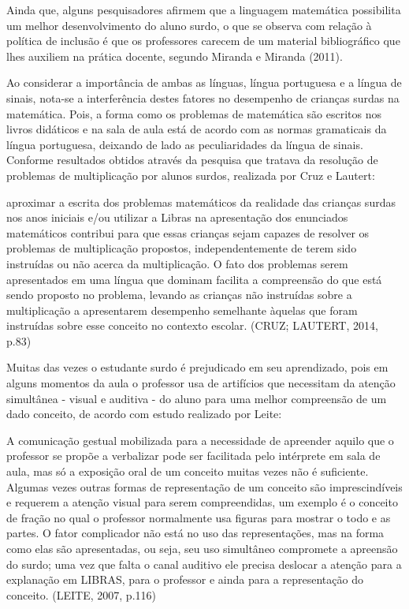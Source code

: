 \documentclass[brasil]{abnt}
\begin{document}
	Ainda que, alguns pesquisadores afirmem que a linguagem matemática possibilita um melhor desenvolvimento do aluno surdo, o que se observa com relação à política de inclusão é que os professores carecem 
	de um material bibliográfico que lhes auxiliem na prática docente, segundo Miranda e Miranda (2011).
	
	Ao considerar a importância de ambas as línguas, língua portuguesa e a língua de sinais, nota-se a interferência destes fatores no desempenho de crianças surdas na matemática. Pois, a forma como os problemas 
	de matemática são escritos nos livros didáticos e na sala de aula está de acordo com as normas gramaticais da língua portuguesa, deixando de lado as peculiaridades da língua de sinais. Conforme resultados obtidos
	através da pesquisa que tratava da resolução de problemas de multiplicação por alunos surdos, realizada por Cruz e Lautert:
	
			\begin{citacao} [...] aproximar a escrita dos problemas matemáticos da realidade das crianças surdas nos anos iniciais e/ou utilizar a Libras na apresentação dos enunciados matemáticos contribui para que
							essas crianças sejam capazes de resolver os problemas de multiplicação propostos, independentemente de terem sido instruídas ou não acerca da multiplicação. O fato
							dos problemas serem apresentados em uma língua que dominam facilita a compreensão do que está sendo proposto no problema, levando as crianças não instruídas sobre a multiplicação a apresentarem 
							desempenho semelhante àquelas que foram instruídas sobre esse conceito no contexto escolar. (CRUZ; LAUTERT, 2014, p.83)
			\end{citacao}

	Muitas das vezes o estudante surdo é prejudicado em seu aprendizado, pois em alguns momentos da aula o professor usa de artifícios que necessitam da atenção simultânea - visual e auditiva - do aluno para uma melhor 
	compreensão de um dado conceito, de acordo com estudo realizado por Leite: 

			\begin{citacao}A comunicação gestual mobilizada para a necessidade de apreender aquilo que o professor se propõe a verbalizar pode ser facilitada pelo intérprete em sala de aula, mas só a exposição oral de um 
							conceito muitas vezes não é suficiente. Algumas vezes outras formas  de  representação  de  um  conceito  são  imprescindíveis  e  requerem  a  atenção visual  para  serem  compreendidas,  um  
							exemplo  é  o  conceito  de  fração  no  qual  o professor normalmente usa figuras para mostrar o todo e as partes. O fator complicador não está no uso das representações, mas na forma como 
							elas são apresentadas, ou seja, seu  uso  simultâneo  compromete  a  apreensão  do  surdo; uma  vez  que  falta  o  canal auditivo ele precisa deslocar a atenção para a explanação em LIBRAS, 
							para o professor e ainda para a representação do conceito. (LEITE, 2007, p.116) 
			\end{citacao}
	
\end{document}

